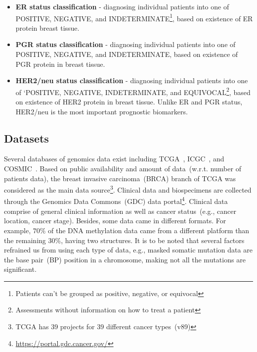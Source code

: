 \begin{itemize}[noitemsep]
    \item \textbf{ER status classification} - diagnosing individual patients into one of POSITIVE, NEGATIVE, and INDETERMINATE\footnote{Patients can't be grouped as positive, negative, or equivocal}, based on existence of ER protein breast tissue. 
    \item \textbf{PGR status classification} - diagnosing individual patients into one of POSITIVE, NEGATIVE, and INDETERMINATE, based on existence of PGR protein in breast tissue. 
    \item \textbf{HER2/neu status classification} - diagnosing individual patients into one of `POSITIVE, NEGATIVE, INDETERMINATE, and EQUIVOCAL\footnote{Assessments without information on how to treat a patient}, based on existence of HER2 protein in breast tissue. Unlike ER and PGR status, HER2/neu is the most important prognostic biomarkers. 
\end{itemize}

\subsection{Datasets}
\label{dc}
Several databases of genomics data exist including TCGA~\cite{tcga}, ICGC~\cite{icgc}, and COSMIC~\cite{forbes}. Based on public availability and amount of data~(w.r.t. number of patients data), the breast invasive carcinoma~(BRCA) branch of TCGA was considered as the main data source\footnote{TCGA has 39 projects for 39 different cancer types~(v89)}. Clinical data and biospecimens are collected through the Genomics Data Commons~(GDC) data portal\footnote{\url{https://portal.gdc.cancer.gov/}}. Clinical data comprise of general clinical information as well as cancer status~(e.g., cancer location, cancer stage). Besides, some data came in different formats. For example, $70\%$ of the DNA methylation data came from a different platform than the remaining $30\%$, having two structures. It is to be noted that several factors refrained us from using each type of data, e.g., masked somatic mutation data are the base pair~(BP) position in a chromosome, making not all the mutations are significant. 

